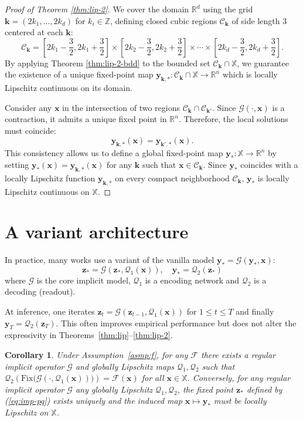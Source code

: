 \documentclass{amsart} %
\def\eqref#1{equation~\ref{#1}}
\def\vk{{\bm{k}}}
\def\vx{{\bm{x}}}
\def\vy{{\bm{y}}}
\def\vz{{\bm{z}}}
\def\sR{{\mathbb{R}}}
\def\sX{{\mathbb{X}}}
\def\sZ{{\mathbb{Z}}}
\def\cC{{\mathcal{C}}}
\def\cF{{\mathcal{F}}}
\def\cG{{\mathcal{G}}}
\def\cQ{{\mathcal{Q}}}
\newtheorem{corollary}[theorem]{Corollary}
\theoremstyle{definition}
\theoremstyle{remark}
\renewcommand{\eqref}[1]{\textup{(\ref{#1})}}
\begin{document}
\begin{proof}[Proof of Theorem \ref{thm:lip-2}] We cover the domain $\sR^d$ using the grid $\vk = (2k_1,\ldots,2k_d)$ for $k_i\in \sZ$, defining closed cubic regions $\cC_\vk$ of side length 3 centered at each $\vk$:
$$
\cC_\vk =\left[ 2k_1-\frac{3}{2}, 2k_1+\frac{3}{2}  \right]\times\left[ 2k_2-\frac{3}{2}, 2k_2+\frac{3}{2}  \right]\times \cdots \times \left[ 2k_d-\frac{3}{2}, 2k_d+\frac{3}{2}  \right].
$$
By applying Theorem \ref{thm:lip-2-bdd} to the bounded set $\cC_\vk\cap \sX$, we guarantee the existence of a unique fixed-point map $\vy_{\vk,*}: \cC_\vk\cap \sX \to \sR^n$ which is locally Lipschitz continuous on its domain.

Consider any $\vx$ in the intersection of two regions $\cC_\vk \cap \cC_{\vk'}$. Since $\cG(\cdot,\vx)$ is a contraction, it admits a unique fixed point in $\sR^n$. Therefore, the local solutions must coincide:
$$\vy_{\vk,*}(\vx)= \vy_{\vk',*}(\vx).$$
This consistency allows us to define a global fixed-point map $\vy_*: \sX \to \sR^n$ by setting $\vy_*(\vx) = \vy_{\vk,*}(\vx)$ for any $\vk$ such that $\vx \in \cC_\vk$. Since $\vy_*$ coincides with a locally Lipschitz function $\vy_{\vk,*}$ on every compact neighborhood $\cC_\vk$, $\vy_*$ is locally Lipschitz continuous on $\sX$. \end{proof}





\section{A variant architecture}
\label{sec:app-general}

In practice, many works use a variant of the vanilla model $\vy_\ast=\cG(\vy_\ast,\vx)$:
\begin{equation}
\label{eq:imp-pq}
\vz_\ast = \cG(\vz_\ast,\cQ_1(\vx)),\quad \vy_\ast=\cQ_2(\vz_\ast)
\end{equation}
where $\cG$ is the core implicit model, $\cQ_1$ is a encoding network and $\cQ_2$ is a decoding (readout). 

At inference, one iterates $\vz_{t}=\cG(\vz_{t-1},\cQ_1(\vx))$ for $1 \leq t \leq T$ and finally $\vy_T = \cQ_{2}(\vz_T)$. This often improves empirical performance but does not alter the expressivity in Theorems~\ref{thm:lip}–\ref{thm:lip-2}.
\begin{corollary}
\label{coro:imp-pq}
Under Assumption~\ref{asmp:f}, for any $\cF$ there exists a {regular} implicit operator $\cG$ and globally Lipschitz maps $\cQ_1,\cQ_2$ such that $\cQ_2\left(\mathrm{Fix}\big(\cG(\cdot,\cQ_1(\vx))\big)\right)=\cF(\vx)$ for all $\vx\in\sX$. Conversely, for any {regular} implicit operator $\cG$ any globally Lipschitz $\cQ_1,\cQ_2$, the fixed point $\vz_\ast$ defined by \eqref{eq:imp-pq} exists uniquely and the induced map $\vx \mapsto \vy_\ast$ must be locally Lipschitz on $\sX$.
\end{corollary}
\end{document}
